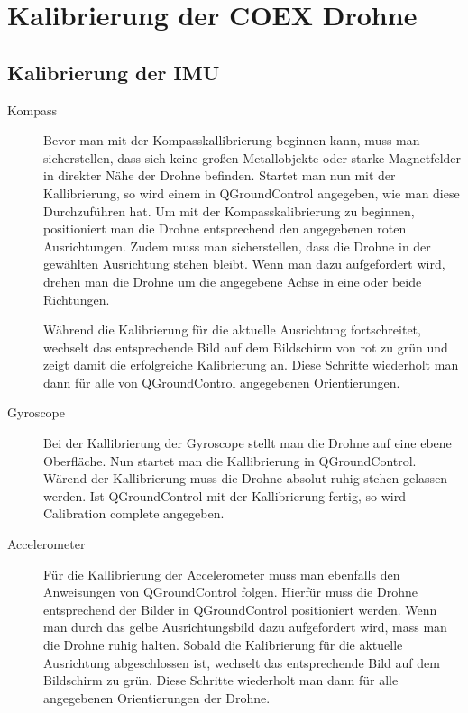 \section{Kalibrierung der COEX Drohne} \label{kalibrierung_coex__drohne:subsection}
\subsection{Kalibrierung der IMU}
\begin{description}
    \item[Kompass] Bevor man mit der Kompasskallibrierung beginnen kann, muss man sicherstellen, dass sich keine großen Metallobjekte oder starke Magnetfelder in direkter Nähe der Drohne befinden. Startet man nun mit der Kallibrierung, so wird einem in QGroundControl angegeben, wie man diese Durchzuführen hat. Um mit der Kompasskalibrierung zu beginnen, positioniert man die Drohne entsprechend den angegebenen roten Ausrichtungen. Zudem muss man sicherstellen, dass die Drohne in der gewählten Ausrichtung stehen bleibt. Wenn man dazu aufgefordert wird, drehen man die Drohne um die angegebene Achse in eine oder beide Richtungen.

    Während die Kalibrierung für die aktuelle Ausrichtung fortschreitet, wechselt das entsprechende Bild auf dem Bildschirm von rot zu grün und zeigt damit die erfolgreiche Kalibrierung an. Diese Schritte wiederholt man dann für alle von QGroundControl angegebenen Orientierungen.
    
    \item[Gyroscope] Bei der Kallibrierung der Gyroscope stellt man die Drohne auf eine ebene Oberfläche. Nun startet man die Kallibrierung in QGroundControl. Wärend der Kallibrierung muss die Drohne absolut ruhig stehen gelassen werden. Ist QGroundControl mit der Kallibrierung fertig, so wird Calibration complete angegeben.
    
    \item[Accelerometer] Für die Kallibrierung der Accelerometer muss man ebenfalls den Anweisungen von QGroundControl folgen. Hierfür muss die Drohne entsprechend der Bilder in QGroundControl positioniert werden. Wenn man durch das gelbe Ausrichtungsbild dazu aufgefordert wird, mass man die Drohne ruhig halten. Sobald die Kalibrierung für die aktuelle Ausrichtung abgeschlossen ist, wechselt das entsprechende Bild auf dem Bildschirm zu grün. Diese Schritte wiederholt man dann für alle angegebenen Orientierungen der Drohne.
\end{description}

